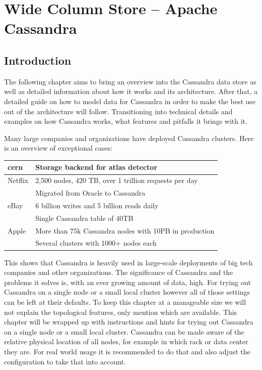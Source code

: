 \chapter{Wide Column Store -- Apache Cassandra}

\section{Introduction}


The following chapter aims to bring an overview into the Cassandra data store as well as detailed information about how it works and its architecture.
After that, a detailed guide on how to model data for Cassandra in order to make the best use out of the architecture will follow.
Transitioning into technical details and examples on how Cassandra works, what features and pitfalls it brings with it.


Many large companies and organizations have deployed Cassandra clusters.
Here is an overview of exceptional cases:

 \begin{tabular}{@{}ll}
   \gls{cern}    & Storage backend for \gls{atlas} detector \autocite{cassandra_cern} \\
   \hline
   Netflix & 2,500 nodes, 420 TB, over 1 trillion requests per day \\
           & Migrated from Oracle to Cassandra \autocite{cassandra_netflix} \\
   \hline
   eBay    & 6 billion writes and 5 billion reads daily \\
           & Single Cassandra table of 40TB \autocite{cassandra_ebay, cassandra_ebay2} \\
   \hline
   Apple   & More than 75k Cassandra nodes with 10PB in production \\
           & Several clusters with 1000+ nodes each \autocite{cassandra_apple} \\
 \end{tabular}

This shows that Cassandra is heavily used in large-scale deployments of big tech companies and other organizations. The significance of Cassandra and the problems it solves is, with an ever growing amount of data, high.
For trying out Cassandra on a single node or a small local cluster however all of those settings can be left at their defaults. To keep this chapter at a manageable size we will not explain the topological features, only mention which are available.
This chapter will be wrapped up with instructions and hints for trying out Cassandra on a single node or a small local cluster.
Cassandra can be made aware of the relative physical location of all nodes, for example in which rack or data center they are. For real world usage it is recommended to do that and also adjust the configuration to take that into account.

